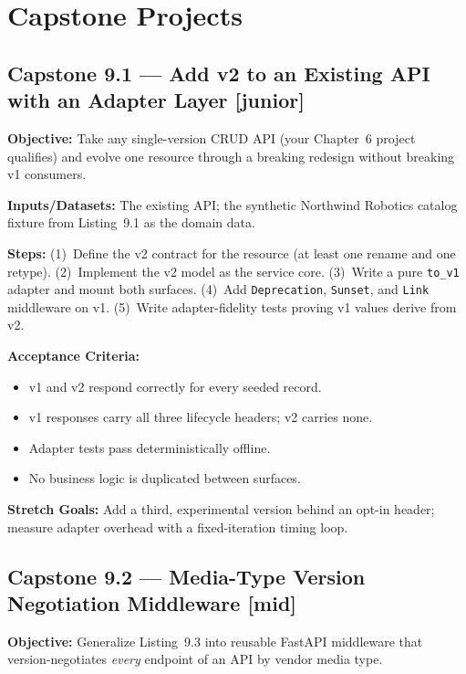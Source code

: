 \section{Capstone Projects}
\label{sec:ch9-capstones}

\subsection*{Capstone 9.1 --- Add v2 to an Existing API with an Adapter Layer \hfill [junior]}
\textbf{Objective:} Take any single-version CRUD API (your Chapter~6 project
qualifies) and evolve one resource through a breaking redesign without
breaking v1 consumers.

\textbf{Inputs/Datasets:} The existing API; the synthetic Northwind Robotics
catalog fixture from Listing~9.1 as the domain data.

\textbf{Steps:} (1)~Define the v2 contract for the resource (at least one
rename and one retype). (2)~Implement the v2 model as the service core.
(3)~Write a pure \texttt{to\_v1} adapter and mount both surfaces.
(4)~Add \texttt{Deprecation}, \texttt{Sunset}, and \texttt{Link} middleware
on v1. (5)~Write adapter-fidelity tests proving v1 values derive from v2.

\textbf{Acceptance Criteria:}
\begin{itemize}
  \item[$\square$] v1 and v2 respond correctly for every seeded record.
  \item[$\square$] v1 responses carry all three lifecycle headers; v2 carries
        none.
  \item[$\square$] Adapter tests pass deterministically offline.
  \item[$\square$] No business logic is duplicated between surfaces.
\end{itemize}

\textbf{Stretch Goals:} Add a third, experimental version behind an opt-in
header; measure adapter overhead with a fixed-iteration timing loop.

\subsection*{Capstone 9.2 --- Media-Type Version Negotiation Middleware \hfill [mid]}
\textbf{Objective:} Generalize Listing~9.3 into reusable FastAPI middleware
that version-negotiates \emph{every} endpoint of an API by vendor media type.

